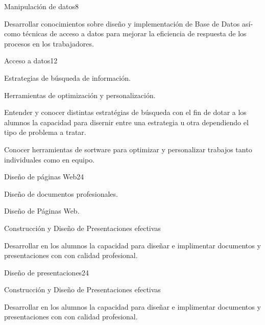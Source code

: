 \begin{syllabus}
\begin{unit}{Manipulación de datos}{}{8}
   \begin{unitgoals}
      \item  Desarrollar conocimientos sobre diseño y implementación de Base de Datos así­ como técnicas de acceso a datos para mejorar la eficiencia de respuesta de los procesos en los trabajadores.
   \end{unitgoals}
\end{unit}

\begin{unit}{Acceso a datos}{}{12}
   \begin{topics}
      \item Estrategias de búsqueda de información.
      \item Herramientas de optimización y personalización.
   \end{topics}

   \begin{unitgoals}
      \item Entender y conocer distintas estratégias de búsqueda con el fin de dotar a los alumnos la capacidad para disernir entre una estrategia  u otra dependiendo el tipo de problema a tratar.
      \item  Conocer herramientas de sortware para optimizar y personalizar trabajos tanto individuales como en equipo.
   \end{unitgoals}
\end{unit}

\begin{unit}{Diseño de páginas Web}{}{24}
   \begin{topics}
      \item Diseño de documentos profesionales.
      \item Diseño de Páginas Web.
      \item Construcción  y Diseño de Presentaciones  efectivas 
    \end{topics}
  \begin{unitgoals}
      \item Desarrollar en los alumnos la capacidad para diseñar  e implimentar documentos y presentaciones con 
       con calidad profesional.
  \end{unitgoals}
\end{unit}

\begin{unit}{Diseño de presentaciones}{}{24}
   \begin{topics}
      \item Construcción  y Diseño de Presentaciones  efectivas 
    \end{topics}
  \begin{unitgoals}
      \item Desarrollar en los alumnos la capacidad para diseñar  e implimentar documentos y presentaciones con 
       con calidad profesional.
  \end{unitgoals}
\end{unit}


\end{syllabus}
